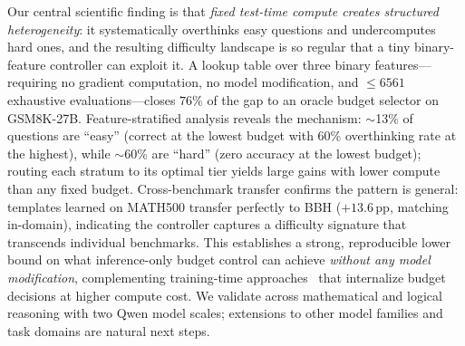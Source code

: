 Our central scientific finding is that \emph{fixed test-time compute creates structured heterogeneity}: it systematically overthinks easy questions and undercomputes hard ones, and the resulting difficulty landscape is so regular that a tiny binary-feature controller can exploit it.
A lookup table over three binary features---requiring no gradient computation, no model modification, and $\leq 6561$ exhaustive evaluations---closes $76\%$ of the gap to an oracle budget selector on GSM8K-27B.
Feature-stratified analysis reveals the mechanism: $\sim$13\% of questions are ``easy'' (correct at the lowest budget with 60\% overthinking rate at the highest), while $\sim$60\% are ``hard'' (zero accuracy at the lowest budget); routing each stratum to its optimal tier yields large gains with lower compute than any fixed budget.
Cross-benchmark transfer confirms the pattern is general: templates learned on MATH500 transfer perfectly to BBH ($+13.6$\,pp, matching in-domain), indicating the controller captures a difficulty signature that transcends individual benchmarks.
This establishes a strong, reproducible lower bound on what inference-only budget control can achieve \emph{without any model modification}, complementing training-time approaches~\citep{liu2025selfbudgeter,yang2025budgetthinker,han2025tale} that internalize budget decisions at higher compute cost.
We validate across mathematical and logical reasoning with two Qwen model scales; extensions to other model families and task domains are natural next steps.
